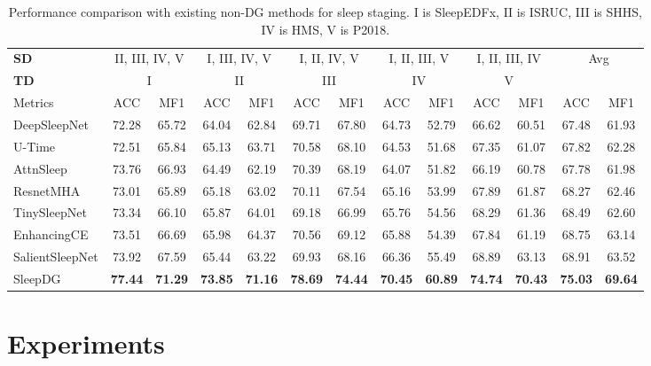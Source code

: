 \documentclass[letterpaper]{article} %
\begin{document}
	\begin{table}[tb]
		\centering
		\small
		\begin{tabular}{lcccccccccccc}
			\toprule
			\textbf{SD}& \multicolumn{2}{c}{II, III, IV, V} & \multicolumn{2}{c}{I, III, IV, V} & \multicolumn{2}{c}{I, II, IV, V} & \multicolumn{2}{c}{I, II, III, V} & \multicolumn{2}{c}{I, II, III, IV}& \multicolumn{2}{c}{\multirow{2}{*}{Avg}}\\
			\cmidrule(lr){1-1}\cmidrule(lr){2-3}\cmidrule(lr){4-5}\cmidrule(lr){6-7}\cmidrule(lr){8-9}\cmidrule(lr){10-11}
			\textbf{TD}&\multicolumn{2}{c}{I} & \multicolumn{2}{c}{II} & \multicolumn{2}{c}{III} & \multicolumn{2}{c}{IV} & \multicolumn{2}{c}{V}&&\\
			\cmidrule(lr){1-1}\cmidrule(lr){2-3}\cmidrule(lr){4-5}\cmidrule(lr){6-7}\cmidrule(lr){8-9}\cmidrule(lr){10-11}\cmidrule(lr){12-13}
			Metrics& ACC & MF1 & ACC & MF1 & ACC & MF1 & ACC & MF1 & ACC & MF1 & ACC & MF1 \\
			\midrule
			DeepSleepNet&72.28&65.72&64.04&62.84&69.71&67.80&64.73&52.79&66.62&60.51&67.48&61.93\\
			U-Time&72.51&65.84&65.13&63.71&70.58&68.10&64.53&51.68&67.35&61.07&67.82&62.28\\
			AttnSleep&73.76&66.93&64.49&62.19&70.39&68.19&64.07&51.82&66.19&60.78&67.78&61.98\\
			ResnetMHA&73.01&65.89&65.18&63.02&70.11&67.54&65.16&53.99&67.89&61.87&68.27&62.46\\
			TinySleepNet&73.34&66.10&65.87&64.01&69.18&66.99&65.76&54.56&68.29&61.36&68.49&62.60\\
			EnhancingCE&73.51&66.69&65.98&64.37&70.56&69.12&65.88&54.39&67.84&61.19&68.75&63.14\\
			SalientSleepNet&73.92&67.59&65.44&63.22&69.93&68.16&66.36&55.49&68.89&63.13&68.91&63.52\\
			\midrule
			SleepDG&\textbf{77.44}&\textbf{71.29}&\textbf{73.85}&\textbf{71.16}&\textbf{78.69}&\textbf{74.44}&\textbf{70.45}&\textbf{60.89}&\textbf{74.74}&\textbf{70.43}&\textbf{75.03}&\textbf{69.64}\\
			\bottomrule
		\end{tabular}
		\caption{Performance comparison with existing non-DG methods for sleep staging. I is SleepEDFx, II is ISRUC, III is SHHS, IV is HMS, V is P2018.}\label{tab:CompSS}
	\end{table}

	\section{Experiments}
\end{document}
